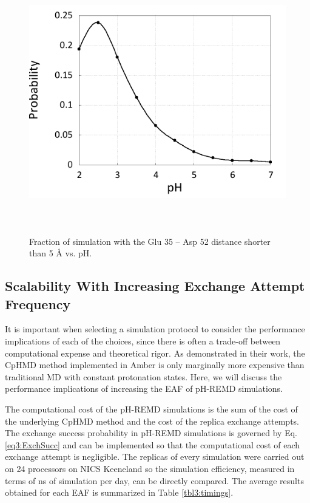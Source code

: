 \begin{figure}
 \includegraphics[width=6in, height=4.5in]{Catalytic_Distances_Int.png}
 \caption{Fraction of simulation with the Glu 35 -- Asp 52 distance shorter than
          5 \mbox{\normalfont \AA} vs. pH.}
 \label{fig3:cat_dist_int}
\end{figure}

\subsection{Scalability With Increasing Exchange Attempt Frequency}

It is important when selecting a simulation protocol to consider the performance
implications of each of the choices, since there is often a trade-off between
computational expense and theoretical rigor.  As
\citeauthor{Mongan_JComputChem_2004_v25_p2038} demonstrated in their work, the
CpHMD method implemented in Amber is only marginally more expensive than
traditional MD with constant protonation states.
\cite{Mongan_JComputChem_2004_v25_p2038}  Here, we will discuss the performance
implications of increasing the EAF of pH-REMD simulations.

The computational cost of the pH-REMD simulations is the sum of the cost of the
underlying CpHMD method \cite{Mongan_JComputChem_2004_v25_p2038} and the cost of
the replica exchange attempts.  The exchange success probability in pH-REMD
simulations is governed by Eq. \ref{eq3:ExchSucc} and can be implemented so that
the computational cost of each exchange attempt is negligible.  The replicas of
every simulation were carried out on 24 processors on NICS Keeneland
\cite{Vetter2011} so the simulation efficiency, measured in terms of ns of
simulation per day, can be directly compared. The average results obtained for
each EAF is summarized in Table \ref{tbl3:timings}.

